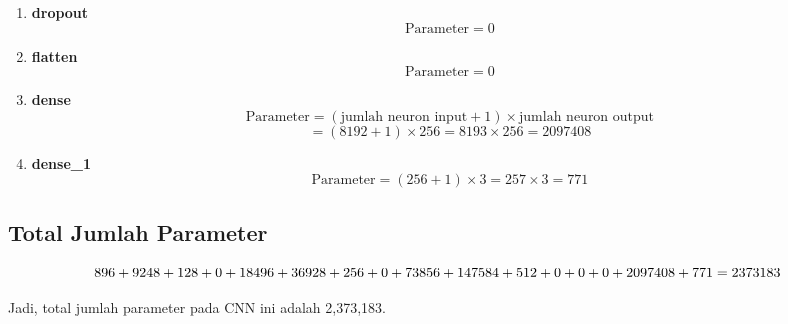 \begin{enumerate}
    \item \textbf{dropout}
    \[
    \text{Parameter} = 0
    \]

    \item \textbf{flatten}
    \[
    \text{Parameter} = 0
    \]

    \item \textbf{dense}
    \[
    \text{Parameter} = (\text{jumlah neuron input} + 1) \times \text{jumlah neuron output}
    \]
    \[
    = (8192 + 1) \times 256 = 8193 \times 256 = 2097408
    \]

    \item \textbf{dense\_1}
    \[
    \text{Parameter} = (256 + 1) \times 3 = 257 \times 3 = 771
    \]
\end{enumerate}

\subsection*{Total Jumlah Parameter}

\[
896 + 9248 + 128 + 0 + 18496 + 36928 + 256 + 0 + 73856 + 147584 \\
+ 512 + 0 + 0 + 0 + 2097408 + 771 = 2373183
\]

Jadi, total jumlah parameter pada CNN ini adalah 2,373,183.
